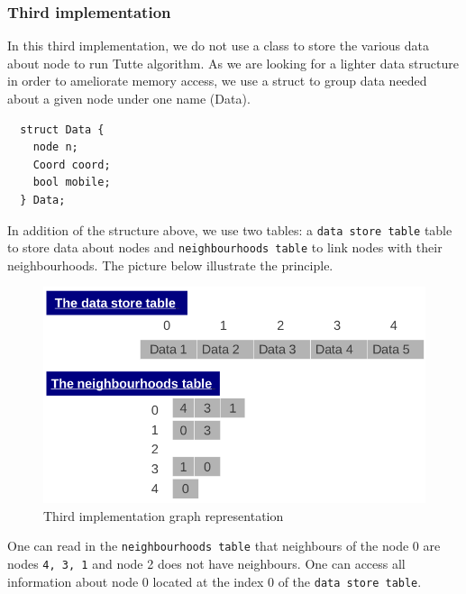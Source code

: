 \subsubsection{Third implementation}
In this third implementation, we do not use a class to store the
various data about node to run Tutte algorithm. 
As we are looking for a lighter data structure in order to ameliorate 
memory access, we use a \textsf{struct} to group data needed about a given node
under one name (\textsf{Data}). 
\begin{lstlisting}
  struct Data {
    node n;
    Coord coord;
    bool mobile;
  } Data;
\end{lstlisting}
In addition of the structure above, we use two tables: a \texttt{data store table} table to store data about nodes and \texttt{neighbourhoods table} to link nodes with their neighbourhoods. The picture below illustrate the principle.
\begin {figure}[H]
  \centering
  \includegraphics[scale=0.5]{img/struct3.png}
  \caption{Third implementation graph representation}
  \label{struct3}
\end {figure}
\noindent One can read in the \texttt{neighbourhoods table} that neighbours of the node 0 are nodes \texttt{4, 3,  1} and node 2 does not have neighbours. One can access all information about node 0 located at the index 0 of the \texttt{data store table}.  
